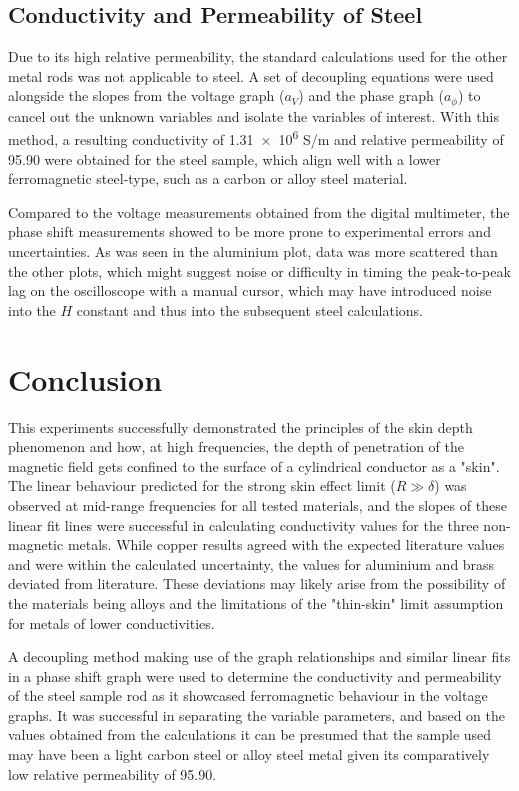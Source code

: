 \documentclass[11pt, a4paper, twocolumn]{article}
\begin{document}
\subsection{Conductivity and Permeability of Steel}

Due to its high relative permeability, the standard calculations used for the other metal rods was not applicable to steel. A set of decoupling equations were used alongside the slopes from the voltage graph ($a_V$) and the phase graph ($a_{\phi}$) to cancel out the unknown variables and isolate the variables of interest. With this method, a resulting conductivity of \num{1.31e6} S/m and relative permeability of 95.90 were obtained for the steel sample, which align well with a lower ferromagnetic steel-type, such as a carbon or alloy steel material.

Compared to the voltage measurements obtained from the digital multimeter, the phase shift measurements showed to be more prone to experimental errors and uncertainties. As was seen in the aluminium plot, data was more scattered than the other plots, which might suggest noise or difficulty in timing the peak-to-peak lag on the oscilloscope with a manual cursor, which may have introduced noise into the $H$ constant and thus into the subsequent steel calculations.

\section{Conclusion}

This experiments successfully demonstrated the principles of the skin depth phenomenon and how, at high frequencies, the depth of penetration of the magnetic field gets confined to the surface of a cylindrical conductor as a "skin". The linear behaviour predicted for the strong skin effect limit ($R \gg \delta$) was observed at mid-range frequencies for all tested materials, and the slopes of these linear fit lines were successful in calculating conductivity values for the three non-magnetic metals. While copper results agreed with the expected literature values and were within the calculated uncertainty, the values for aluminium and brass deviated from literature. These deviations may likely arise from the possibility of the materials being alloys and the limitations of the "thin-skin" limit assumption for metals of lower conductivities.

A decoupling method making use of the graph relationships and similar linear fits in a phase shift graph were used to determine the conductivity and permeability of the steel sample rod as it showcased ferromagnetic behaviour in the voltage graphs. It was successful in separating the variable parameters, and based on the values obtained from the calculations it can be presumed that the sample used may have been a light carbon steel or alloy steel metal given its comparatively low relative permeability of 95.90.
\end{document}
